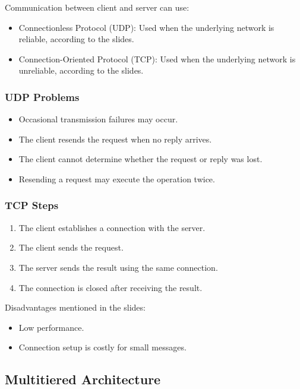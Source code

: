 \documentclass{article}
\begin{document}
Communication between client and server can use:

\begin{itemize}
    \item Connectionless Protocol (UDP): Used when the underlying network is reliable, according to the slides.
    \item Connection-Oriented Protocol (TCP): Used when the underlying network is unreliable, according to the slides.
\end{itemize}

\subsubsection{UDP Problems}

\begin{itemize}
    \item Occasional transmission failures may occur.
    \item The client resends the request when no reply arrives.
    \item The client cannot determine whether the request or reply was lost.
    \item Resending a request may execute the operation twice.
\end{itemize}

\subsubsection{TCP Steps}

\begin{enumerate}
    \item The client establishes a connection with the server.
    \item The client sends the request.
    \item The server sends the result using the same connection.
    \item The connection is closed after receiving the result.
\end{enumerate}

Disadvantages mentioned in the slides:

\begin{itemize}
    \item Low performance.
    \item Connection setup is costly for small messages.
\end{itemize}

\subsection{Multitiered Architecture}
\end{document}
